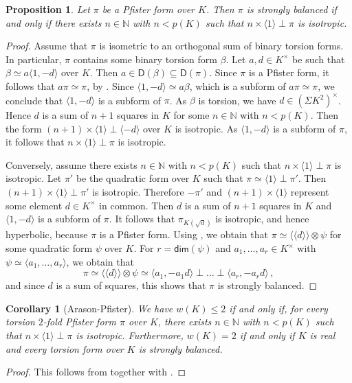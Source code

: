 \documentclass[twoside,11pt]{amsart}
\numberwithin{equation}{section}
\newtheorem{prop}[equation]{Proposition}
\newtheorem{cor}[equation]{Corollary}
\theoremstyle{definition}
\renewcommand{\dim}{\operatorname{\mathsf{dim}}}
\newcommand{\mg}[1]{{#1}^{\times}}
\newcommand{\nat}{\mathbb{N}}
\newcommand{\la}{\langle}
\newcommand{\ra}{\rangle}
\newcommand{\lla}{\la\!\la}
\newcommand{\rra}{\ra\!\ra}
\renewcommand{\leq}{\leqslant}
\renewcommand{\dim}{\mathsf{dim}}
\renewcommand{\leq}{\leqslant}
\newcommand{\D}{\mathsf{D}}
\begin{document}
\begin{prop}\label{Pfister-balanced}
    Let $\pi$ be a Pfister form over $K$.
    Then $\pi$ is strongly balanced 
    if and only if there exists $n\in\nat$ with $n< p(K)$ such that $n\times\la 1\ra\perp\pi$ is isotropic.
\end{prop}
\begin{proof}
Assume that $\pi$ is isometric to an orthogonal sum of binary torsion forms. 
In particular, $\pi$ contains some binary torsion form $\beta$. 
Let $a,d\in\mg{K}$ be such that $\beta\simeq a \la 1, -d \ra$ over $K$. 
Then $a\in\D(\beta)\subseteq\D(\pi)$. Since $\pi$ is a Pfister form, it follows that $a\pi\simeq \pi$, by \cite[Chap.~X, Theorem~2.8]{Lam05}.
Since $\la 1,-d\ra\simeq a\beta$, which is a subform of $a\pi\simeq\pi$, 
we conclude that $\la 1,-d\ra$ is a subform of $\pi$.
As $\beta$ is torsion, we have $d\in\mg{(\mathsf{\Sigma}K^2)}$.
Hence $d$ is a sum of $n+1$ squares in $K$ for some $n\in\nat$ with $n< p(K)$.
Then the form $(n+1)\times \la 1\ra\perp\la -d\ra$ over $K$ is isotropic.
As $\la 1,-d\ra$ is a subform of $\pi$, it follows that $n\times \la 1\ra\perp\pi$ is isotropic.

Conversely, assume there exists $n\in\nat$ with $n< p(K)$ such that $n\times\la 1\ra\perp\pi$ is isotropic. Let $\pi'$ be the quadratic form over $K$ such that $\pi\simeq \la 1\ra\perp\pi'$.
Then $(n+1)\times \la 1\ra\perp\pi'$ is isotropic.
Therefore $-\pi'$ and $(n+1)\times\la 1\ra$ represent some element $d\in \mg{K}$ in common.
Then $d$ is a sum of $n+1$ squares in $K$ and $\la 1,-d\ra$ is a subform of $\pi$.
It follows that $\pi_{K(\sqrt{d})}$ is isotropic, and hence hyperbolic, because $\pi$ is a Pfister form. Using \cite[Chap.~VII, Theorem~3.2]{Lam05}, we obtain that $\pi\simeq \lla d \rra \otimes \psi$ for some quadratic form $\psi$ over $K$.
For $r=\dim(\psi)$ and $a_1,\dots,a_r\in\mg{K}$ with $\psi\simeq \la a_1,\dots,a_r\ra$, we obtain that 
$$\pi\simeq \lla d\rra\otimes\psi\simeq \la a_1,-a_1d\ra\perp\ldots\perp\la a_r,-a_rd\ra\,,$$ 
and since $d$ is a sum of squares, this shows that $\pi$ is strongly balanced.
\end{proof}

\begin{cor}[Arason-Pfister]\label{Arason-Pfister}
        We have $w(K)\leq 2$ if and only if, for every torsion $2$-fold Pfister form $\pi$ over $K$, there exists $n\in\nat$ with $n<p(K)$ such that $n\times\la 1\ra\perp\pi$ is isotropic.
        Furthermore, $w(K)=2$ if and only if $K$ is real and every torsion form over $K$ is strongly balanced.
\end{cor}
    \begin{proof}
        This follows from \cite[Satz 4]{AP77} together with  .
    \end{proof}
\end{document}

